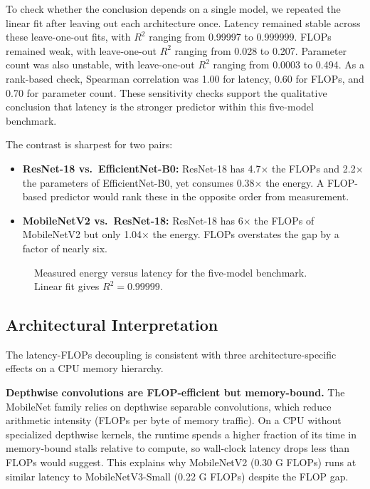 \documentclass[conference]{IEEEtran}
\begin{document}
To check whether the conclusion depends on a single model, we repeated the
linear fit after leaving out each architecture once. Latency remained stable
across these leave-one-out fits, with $R^2$ ranging from 0.99997 to 0.999999.
FLOPs remained weak, with leave-one-out $R^2$ ranging from 0.028 to 0.207.
Parameter count was also unstable, with leave-one-out $R^2$ ranging from
0.0003 to 0.494. As a rank-based check, Spearman correlation was 1.00 for
latency, 0.60 for FLOPs, and 0.70 for parameter count. These sensitivity
checks support the qualitative conclusion that latency is the stronger
predictor within this five-model benchmark.

The contrast is sharpest for two pairs:
\begin{itemize}
\item \textbf{ResNet-18 vs.\ EfficientNet-B0:} ResNet-18 has 4.7$\times$ the
FLOPs and 2.2$\times$ the parameters of EfficientNet-B0, yet consumes
0.38$\times$ the energy. A FLOP-based predictor would rank these in the
opposite order from measurement.
\item \textbf{MobileNetV2 vs.\ ResNet-18:} ResNet-18 has 6$\times$ the FLOPs
of MobileNetV2 but only 1.04$\times$ the energy. FLOPs overstates the gap by a
factor of nearly six.
\end{itemize}

\begin{figure}[ht]
\centering
{}
\caption{Measured energy versus latency for the five-model benchmark. Linear fit gives $R^2 = 0.99999$.}
\label{fig:energy-vs-latency}
\end{figure}

\subsection{Architectural Interpretation}
The latency-FLOPs decoupling is consistent with three architecture-specific
effects on a CPU memory hierarchy.

\textbf{Depthwise convolutions are FLOP-efficient but memory-bound.} The
MobileNet family relies on depthwise separable convolutions, which reduce
arithmetic intensity (FLOPs per byte of memory traffic). On a CPU without
specialized depthwise kernels, the runtime spends a higher fraction of its
time in memory-bound stalls relative to compute, so wall-clock latency drops
less than FLOPs would suggest. This explains why MobileNetV2 (0.30 G FLOPs)
runs at similar latency to MobileNetV3-Small (0.22 G FLOPs) despite the FLOP
gap.
\end{document}
